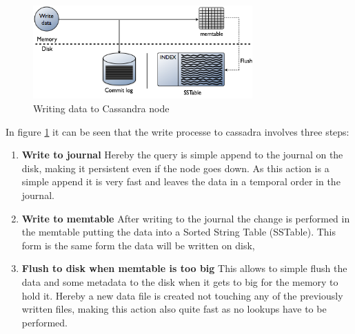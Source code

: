 \begin{figure}[ht]
    \centering
    \includegraphics[width=0.75\textwidth]{img/cassandra_local_write.png}
    \caption{Writing data to Cassandra node \autocite{datastaxWriteData}}
    \label{fig:cassandra:writeData}
\end{figure}
In figure \ref{fig:cassandra:writeData} it can be seen that the write processe to cassadra involves three steps:
\begin{enumerate}
\item \textbf{Write to journal} Hereby the query is simple append to the journal on the disk, making it persistent even if the node goes down. As this action is a simple append it is very fast and leaves the data in a temporal order in the journal.
\item \textbf{Write to memtable} After writing to the journal the change is performed in the memtable putting the data into a Sorted String Table (SSTable). This form is the same form the data will be written on disk,
\item \textbf{Flush to disk when memtable is too big} This allows to simple flush the data and some metadata to the disk when it gets to big for the memory to hold it. Hereby a new data file is created not touching any of the previously written files, making this action also quite fast as no lookups have to be performed.
\end{enumerate}

